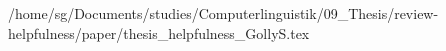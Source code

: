 /home/sg/Documents/studies/Computerlinguistik/09_Thesis/review-helpfulness/paper/thesis_helpfulness_GollyS.tex